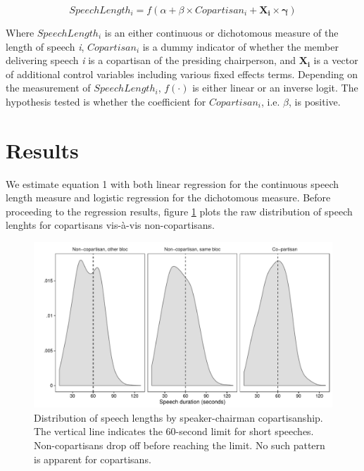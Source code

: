 \documentclass[12pt,a4paper]{article}
\begin{document}
\begin{equation}\label{model}
SpeechLength_i = f( \alpha + \beta \times Copartisan_i + \mathbf{X_i\times\gamma} )
\end{equation}

Where $SpeechLength_i$ is an either continuous or dichotomous measure of the length of speech \textit{i}, $Copartisan_i$ is a dummy indicator of whether the member delivering speech \textit{i} is a copartisan of the presiding chairperson, and $\mathbf{X_i}$ is a vector of additional control variables including various fixed effects terms. Depending on the measurement of $SpeechLength_i$, $f(\cdot)$ is either linear or an inverse logit. The hypothesis tested is whether the coefficient for \textit{$Copartisan_i$}, i.e. \textit{$\beta$}, is positive.

\section{Results}\label{res}

\noindent We estimate equation 1 with both linear regression for the continuous speech length measure and logistic regression for the dichotomous measure. Before proceeding to the regression results, figure \ref{parlbias_dens} plots the raw distribution of speech lenghts for copartisans vis-à-vis non-copartisans.

\begin{figure}[h]
\centering
\includegraphics[scale=.70]{../figures/parlbias_dens}
  \caption{Distribution of speech lengths by speaker-chairman copartisanship. The vertical line indicates the 60-second limit for short speeches. Non-copartisans drop off before reaching the limit. No such pattern is apparent for copartisans.}\label{parlbias_dens}

\end{figure}
\end{document}
